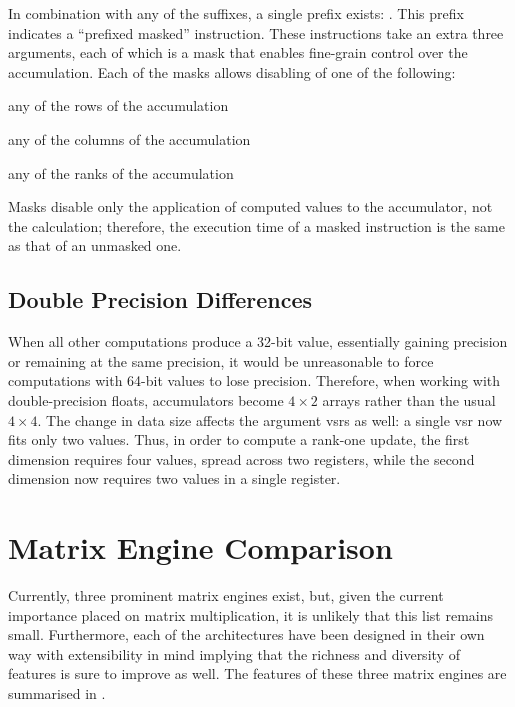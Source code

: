 \documentclass[\main/thesis.tex]{subfiles}
\begin{document}
In combination with any of the suffixes, a single prefix exists: .
This prefix indicates a ``prefixed masked'' instruction.
These instructions take an extra three arguments, each of which is a mask that enables fine-grain control over the accumulation.
Each of the masks allows disabling of one of the following:
\begin{enumerate*}[itemjoin*={{ or }}, label=\textbf{(\arabic*)}, after={.}]
  \item any of the rows of the accumulation
  \item any of the columns of the accumulation
  \item any of the ranks of the accumulation
\end{enumerate*}
Masks disable only the application of computed values to the accumulator, not the calculation; therefore, the execution time of a masked instruction is the same as that of an unmasked one.

\subsection{Double Precision Differences}
\label{sec:doubles}
When all other computations produce a 32-bit value, essentially gaining precision or remaining at the same precision, it would be unreasonable to force computations with 64-bit values to lose precision.
Therefore, when working with double-precision floats, accumulators become $4 \times 2$ arrays rather than the usual $4 \times 4$.
The change in data size affects the argument \glspl{vsr} as well: a single \gls{vsr} now fits only two values.
Thus, in order to compute a rank-one update, the first dimension requires four values, spread across two registers, while the second dimension now requires two values in a single register.

\section{Matrix Engine Comparison}
\label{sec:matrixEngines}
Currently, three prominent matrix engines exist, but, given the current importance placed on matrix multiplication, it is unlikely that this list remains small.
Furthermore, each of the architectures have been designed in their own way with extensibility in mind implying that the richness and diversity of features is sure to improve as well.
The features of these three matrix engines are summarised in .
\end{document}
